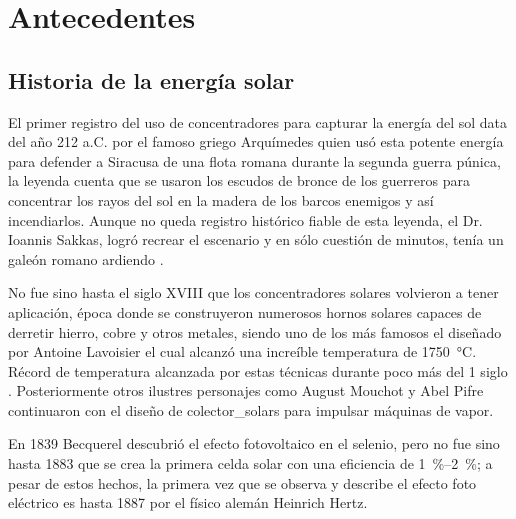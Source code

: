 \section{Antecedentes}

	\subsection{Historia de la energía solar}
		
		El primer registro del uso de concentradores para capturar la energía del sol data del año 212 a.C. por el famoso griego Arquímedes quien usó esta potente energía para defender a Siracusa de una flota romana durante la segunda guerra púnica, la leyenda cuenta que se usaron los escudos de bronce de los guerreros para concentrar los rayos del sol en la madera de los barcos enemigos y así incendiarlos. Aunque no queda registro histórico fiable de esta leyenda, el Dr. Ioannis Sakkas, logró recrear el escenario y en sólo cuestión de minutos, tenía un galeón romano ardiendo \cite{africa_archimedes_1975}.
		
		No fue sino hasta el siglo XVIII que los concentradores solares volvieron a tener aplicación, época donde se construyeron numerosos hornos solares capaces de derretir hierro, cobre y otros metales, siendo uno de los más famosos el diseñado por Antoine Lavoisier el cual alcanzó una increíble temperatura de \SI{1750}{\degreeCelsius}. Récord de temperatura alcanzada por estas técnicas durante poco más del 1 siglo \cite{kalogirou_solar_2004}. Posteriormente otros ilustres personajes como August Mouchot y Abel Pifre continuaron con el diseño de \glspl{colector_solar} para impulsar máquinas de vapor.
		
		En 1839 Becquerel descubrió el efecto fotovoltaico en el selenio, pero no fue sino hasta 1883 que se crea la primera celda solar con una eficiencia de \qtyrange{1}{2}{\percent}; a pesar de estos hechos, la primera vez que se observa y describe el efecto foto eléctrico es hasta 1887 por el físico alemán Heinrich Hertz.
		
